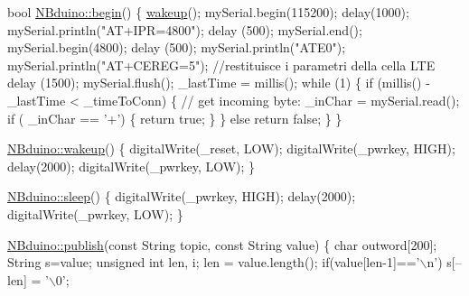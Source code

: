 \begin{DoxyCodeInclude}
\textcolor{keywordtype}{bool} \mbox{\hyperlink{class_n_bduino_ae8241f6dcfe492f00f8bef4b5d4b79a0}{NBduino::begin}}()
\{
    \mbox{\hyperlink{class_n_bduino_a8e740e7b90e6e75b7dd3b7900ee0dd22}{wakeup}}();
    mySerial.begin(115200);
    delay(1000);
    mySerial.println(\textcolor{stringliteral}{"AT+IPR=4800"});
    delay (500);
    mySerial.end();
    mySerial.begin(4800);
    delay (500);
    mySerial.println(\textcolor{stringliteral}{"ATE0"});
    mySerial.println(\textcolor{stringliteral}{"AT+CEREG=5"}); \textcolor{comment}{//restituisce i parametri della cella LTE}
    delay (1500);
    mySerial.flush();
    \_lastTime = millis();
    \textcolor{keywordflow}{while} (1)
    \{
        \textcolor{keywordflow}{if} (millis() - \_lastTime < \_timeToConn) \{
            \textcolor{comment}{// get incoming byte:}
            \_inChar = mySerial.read();
            \textcolor{keywordflow}{if} ( \_inChar == \textcolor{charliteral}{'+'}) \{
                \textcolor{keywordflow}{return} \textcolor{keyword}{true};
            \}
        \}
        \textcolor{keywordflow}{else} \textcolor{keywordflow}{return} \textcolor{keyword}{false};
    \}
\}

\mbox{\hyperlink{class_n_bduino_a8e740e7b90e6e75b7dd3b7900ee0dd22}{NBduino::wakeup}}()
\{
    digitalWrite(\_reset, LOW);
    digitalWrite(\_pwrkey, HIGH);
    delay(2000);
    digitalWrite(\_pwrkey, LOW);
\}

\mbox{\hyperlink{class_n_bduino_ac7bf8f7f0552ad2cbda4b3e91a82bfca}{NBduino::sleep}}()
\{
    digitalWrite(\_pwrkey, HIGH);
    delay(2000);
    digitalWrite(\_pwrkey, LOW);
\}

\mbox{\hyperlink{class_n_bduino_a1c9526fbb36956b1cd41e33dd9133394}{NBduino::publish}}(\textcolor{keyword}{const} String topic, \textcolor{keyword}{const} String value)
\{
    \textcolor{keywordtype}{char} outword[200];
    String s=value;
    \textcolor{keywordtype}{unsigned} \textcolor{keywordtype}{int} len, i;
    len = value.length();
    \textcolor{keywordflow}{if}(value[len-1]==\textcolor{charliteral}{'\(\backslash\)n'})
        s[--len] = \textcolor{charliteral}{'\(\backslash\)0'};


\end{DoxyCodeInclude}
